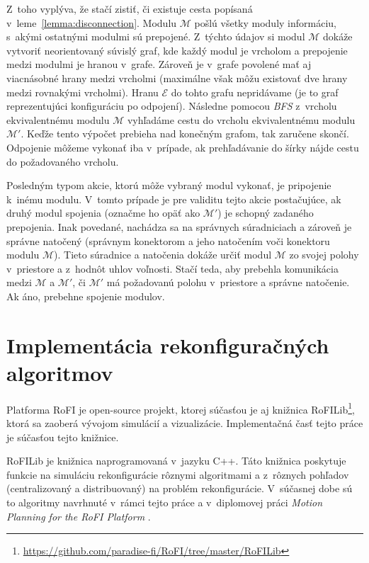 \documentclass[
  printed, %
  oneside, %
  notable,   %
  nolof,     %
  nolot,     %
]{fithesis3}
\begin{document}
Z~toho vyplýva, že stačí zistiť, či existuje cesta popísaná v~leme~\ref{lemma:disconnection}. Modulu $\mathcal{M}$ pošlú všetky moduly informáciu, s~akými ostatnými modulmi sú prepojené. Z~týchto údajov si modul $\mathcal{M}$ dokáže vytvoriť neorientovaný súvislý graf, kde každý modul je vrcholom a prepojenie medzi modulmi je hranou v~grafe. Zároveň je v~grafe povolené mať aj viacnásobné hrany medzi vrcholmi (maximálne však môžu existovať dve hrany medzi rovnakými vrcholmi). Hranu $\mathcal{E}$ do tohto grafu nepridávame (je to graf reprezentujúci konfiguráciu po odpojení). Následne pomocou \textit{BFS} z~vrcholu ekvivalentnému modulu $\mathcal{M}$ vyhľadáme cestu do vrcholu ekvivalentnému modulu $\mathcal{M}'$. Keďže tento výpočet prebieha nad konečným grafom, tak zaručene skončí. Odpojenie môžeme vykonať iba v~prípade, ak prehľadávanie do šírky nájde cestu do požadovaného vrcholu. 

Posledným typom akcie, ktorú môže vybraný modul vykonať, je pripojenie k~inému modulu. V~tomto prípade je pre validitu tejto akcie postačujúce, ak druhý modul spojenia (označme ho opäť ako $\mathcal{M}'$) je schopný zadaného prepojenia. Inak povedané, nachádza sa na správnych súradniciach a zároveň je správne natočený (správnym konektorom a jeho natočením voči konektoru modulu $\mathcal{M}$). Tieto súradnice a natočenia dokáže určiť modul $\mathcal{M}$ zo svojej polohy v~priestore a z~hodnôt uhlov voľnosti. Stačí teda, aby prebehla komunikácia medzi $\mathcal{M}$ a $\mathcal{M}'$, či $\mathcal{M}'$ má požadovanú polohu v~priestore a správne natočenie. Ak áno, prebehne spojenie modulov. 





\chapter{Implementácia rekonfiguračných algoritmov}
\label{sec:implementation}
Platforma RoFI je open-source projekt, ktorej súčasťou je aj knižnica RoFILib\footnote{\url{https://github.com/paradise-fi/RoFI/tree/master/RoFILib}}, ktorá sa zaoberá vývojom simulácií a vizualizácie. Implementačná časť tejto práce je súčasťou tejto knižnice. 

RoFILib je knižnica naprogramovaná v~jazyku C++. Táto knižnica poskytuje funkcie na simuláciu rekonfigurácie rôznymi algoritmami a z~rôznych pohľadov (centralizovaný a distribuovaný) na problém rekonfigurácie. V~súčasnej dobe sú to algoritmy navrhnuté v~rámci tejto práce a v~diplomovej práci \textit{Motion Planning for the RoFI Platform} \cite{vozarovaMasterThesis}.
\end{document}
